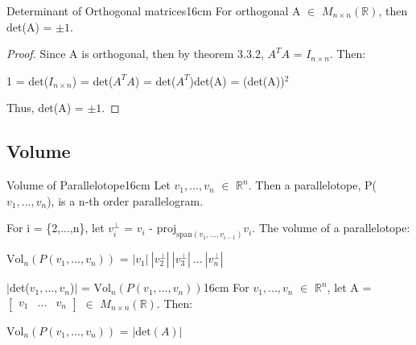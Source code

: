     \vspace{0.5cm}



    \begin{corollary}{Determinant of Orthogonal matrices}{16cm}
        For orthogonal A $\in$ $M_{n \times n}(\mathbb{R})$,
        then det(A) = $\pm 1$.
    \end{corollary}

    \begin{proof}
        Since A is orthogonal, then by {\color{red} theorem 3.3.2},
        $A^TA$ = $I_{n \times n}$. Then:

        \hspace{0.5cm}
        1 = det($I_{n \times n}$)
        = det($A^TA$)
        = det($A^T$)det(A)
        = (det(A))$^2$

        Thus, det(A) = $\pm 1$.
    \end{proof}

    \newpage





\subsection{ Volume }

    \begin{definition}{Volume of Parallelotope}{16cm}
        Let $v_1,...,v_n$ $\in$ $\mathbb{R}^n$.
        Then a {\color{lblue} parallelotope}, P($v_1,...,v_n$),
        is a n-th order parallelogram.

        For i = \{2,...,n\}, let
        $v_i^{\perp}$ = $v_i$ - $\text{proj}_{\text{span}(v_1,...,v_{i-1})}v_i$.
        The volume of a parallelotope:

        \hspace{0.5cm}
        $\text{Vol}_n(P(v_1,...,v_n))$
        = $|v_1| \ |v_2^{\perp}| \ |v_3^{\perp}| \ ... \ |v_n^{\perp}|$
    \end{definition}

    \vspace{0.5cm}



    \begin{wtheorem}{$|$det($v_1,...,v_n$)$|$ = $\text{Vol}_n(P(v_1,...,v_n))$}{16cm}
        For $v_1,...,v_n$ $\in$ $\mathbb{R}^n$,
        let A =
        $\begin{bmatrix}
            v_1 & ... & v_n 
        \end{bmatrix}$
        $\in$ $M_{n \times n}(\mathbb{R})$. Then:

        \hspace{0.5cm}
        $\text{Vol}_n(P(v_1,...,v_n))$
        = $|\text{det}(A)|$
    \end{wtheorem}

